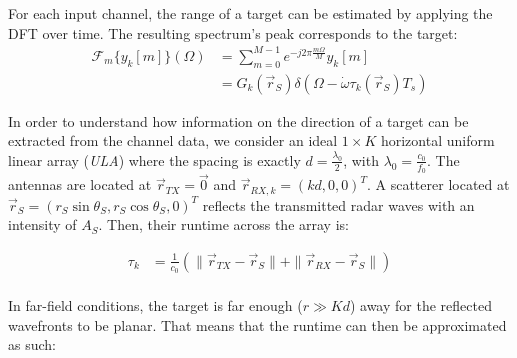For each input channel, the range of a target can be estimated by applying the DFT over time.
The resulting spectrum's peak corresponds to the target:
\begin{align}
    \mathcal{F}_m\{y_k[m]\}(\Omega) & = \sum_{m=0}^{M-1} e^{-j2\pi\frac{m\Omega}{M}} y_k[m]          \\
                                    & = G_k(\vec r_S) \delta(\Omega-\dot \omega \tau_k(\vec r_S)T_s)
\end{align}


In order to understand how information on the direction of a target can be extracted from the channel data,
we consider an ideal $1 \times K$ horizontal uniform linear array (\textit{ULA}) where the spacing is exactly $d=\frac{\lambda_0}{2}$, with $\lambda_0 = \frac{c_0}{f_0}$.
The antennas are located at $\vec r_{TX}= \vec 0$ and $\vec r_{RX,k}=(kd,0,0)^T$.
A scatterer located at  $\vec r_S = (r_S\sin\theta_S, r_{S}\cos\theta_S , 0)^T$  reflects the transmitted radar waves with an intensity of $A_S$.
Then, their runtime across the array is:

\begin{align}
    \tau_k & =\frac{1}{c_0} \left( \| \vec r_{TX} - \vec r_S \|+\| \vec r_{RX} - \vec r_S \| \right) \\
\end{align}

In far-field conditions, the target is far enough ($r \gg K d$) away for the reflected wavefronts to be planar.
That means that the runtime can then be approximated as such:

